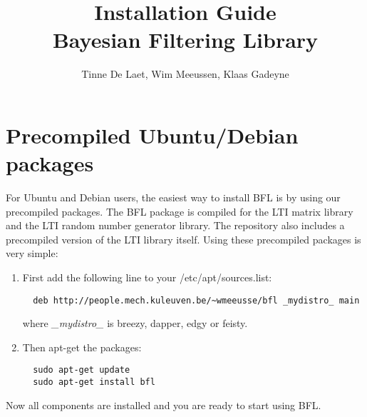 \documentclass[a4paper,10pt]{article}
\title{Installation Guide \\  Bayesian Filtering Library}
\author{Tinne De Laet, Wim Meeussen, Klaas Gadeyne}
\begin{document}
\maketitle



\section{Precompiled Ubuntu/Debian packages}
\label{sec:ubuntu}
For Ubuntu and Debian users, the easiest way to install BFL is by
using our precompiled packages.  The BFL package is compiled for the
LTI matrix library and the LTI random number generator library.  The
repository also includes a precompiled version of the LTI library
itself.  Using these precompiled packages is very simple:
\begin{enumerate}
\item First add the following line to your /etc/apt/sources.list:
\begin{verbatim}
  deb http://people.mech.kuleuven.be/~wmeeusse/bfl _mydistro_ main
\end{verbatim}
  where \emph{\_mydistro\_} is breezy, dapper, edgy or feisty.
\item Then apt-get the packages:
\begin{verbatim}
  sudo apt-get update
  sudo apt-get install bfl
\end{verbatim}
\end{enumerate}
Now all components are installed and you are ready to start using BFL.




\end{document}
